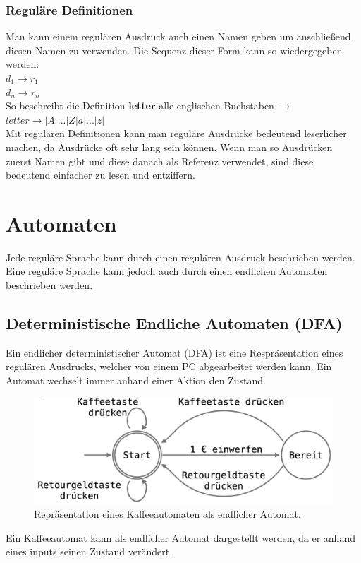 \documentclass{article}
\begin{document}
	\subsubsection{Reguläre Definitionen}
	Man kann einem regulären Ausdruck auch einen Namen geben um anschließend diesen Namen zu verwenden. Die Sequenz dieser Form kann so wiedergegeben werden: \\
	$d_1 \to r_1$ \\
	$d_n \to r_n$ \\
	So beschreibt die Definition \textbf{letter} alle englischen Buchstaben $\to$ $letter \to |A|...|Z|a|...|z|$\\
	Mit regulären Definitionen kann man reguläre Ausdrücke bedeutend leserlicher machen, da Ausdrücke oft sehr lang sein können. Wenn man so Ausdrücken zuerst Namen gibt und diese danach als Referenz verwendet, sind diese bedeutend einfacher zu lesen und entziffern. \\

	\section{Automaten}
	Jede reguläre Sprache kann durch einen regulären Ausdruck beschrieben werden. Eine reguläre Sprache kann jedoch auch durch einen endlichen Automaten beschrieben werden.
	\subsection{Deterministische Endliche Automaten (DFA)}
	Ein endlicher deterministischer Automat (DFA) ist eine Respräsentation eines regulären Ausdrucks, welcher von einem PC abgearbeitet werden kann. Ein Automat wechselt immer anhand einer Aktion den Zustand. \\
	\begin{figure}[H]
	\centering
	\includegraphics[scale=0.3]{Bilder/DFA.png}
	\caption{Repräsentation eines Kaffeeautomaten als endlicher Automat.}
	\end{figure}
	Ein Kaffeeautomat kann als endlicher Automat dargestellt werden, da er anhand eines inputs seinen Zustand verändert. \\
\end{document}
